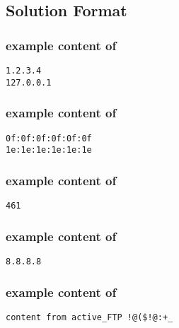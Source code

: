\subsection*{Solution Format}

\hypertarget{ipformat}{}
\subsubsection*{example content of \texttt{\hyperlink{cp1macip}{\fileip}}}
\begin{mdframed}
\begin{Verbatim}
1.2.3.4
127.0.0.1
\end{Verbatim}
\end{mdframed}

\hypertarget{macformat}{}
\subsubsection*{example content of \texttt{\hyperlink{cp1macip}{\filemac}}}
\begin{mdframed}
\begin{Verbatim}
0f:0f:0f:0f:0f:0f
1e:1e:1e:1e:1e:1e
\end{Verbatim}
\end{mdframed}

\hypertarget{tcpformat}{}
\subsubsection*{example content of \texttt{\hyperlink{cp1tcp}{\filetcp}}}
\begin{mdframed}
\begin{Verbatim}
461
\end{Verbatim}
\end{mdframed}

\hypertarget{gwformat}{}
\subsubsection*{example content of \texttt{\hyperlink{cp1gw}{\filegw}}}
\begin{mdframed}
\begin{Verbatim}
8.8.8.8
\end{Verbatim}
\end{mdframed}

\hypertarget{activeformat}{}
\subsubsection*{example content of \texttt{\hyperlink{cp1ftp}{\fileactive}}}
\begin{mdframed}
\begin{Verbatim}
content from active_FTP !@($!@:+_
\end{Verbatim}
\end{mdframed}


